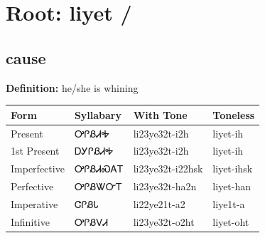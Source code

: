 \documentclass{article}%
\begin{document}
%
\normalsize%
\section*{Root: liyet / }%
\subsection*{cause}%
\textbf{Definition: }%
he/she is whining%
\\[0.5em]%
\begin{tabular}{|l|l|l|l|}%
\hline%
\textbf{Form}&\textbf{Syllabary}&\textbf{With Tone}&\textbf{Toneless}\\%
\hline%
Present&ᎤᎵᏰᏗᎭ&li23ye32t{-}i2h&liyet{-}ih\\%
1st Present&ᎠᎩᎵᏰᏗᎭ&li23ye32t{-}i2h&liyet{-}ih\\%
Imperfective&ᎤᎵᏰᏗᏍᎪᎢ&li23ye32t{-}i22hsk&liyet{-}ihsk\\%
Perfective&ᎤᎵᏰᏔᏅᎢ&li23ye32t{-}ha2n&liyet{-}han\\%
Imperative&ᏣᎵᏰᏓ&li22ye21t{-}a2&liye1t{-}a\\%
Infinitive&ᎤᎵᏰᏙᏗ&li23ye32t{-}o2ht&liyet{-}oht\\%
\hline%
\end{tabular}%
\\[1em]%
\end{document}
